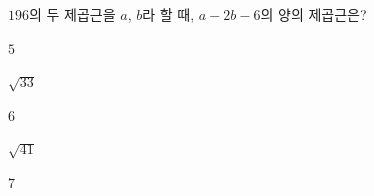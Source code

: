 $196$의 두 제곱근을 $a$, $b$라 할 때, $a-2b-6$의 양의 제곱근은? 
\begin{choices32}{\rule[-3ex]{0pt}{8ex}$5$}{\rule[-3ex]{0pt}{8ex}$\sqrt{33}$}{\rule[-3ex]{0pt}{8ex}$6$}{\rule[-3ex]{0pt}{8ex}$\sqrt{41}$}{\rule[-3ex]{0pt}{8ex}$7$}\end{choices32}

